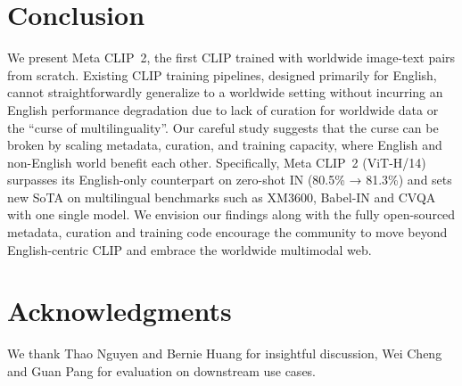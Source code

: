 \section{Conclusion}
\label{conclusion}

We present Meta CLIP~2, the first CLIP trained with worldwide image-text pairs from scratch. Existing CLIP training pipelines, designed primarily for English, cannot straightforwardly generalize to a worldwide setting without incurring an English performance degradation due to lack of curation for worldwide data or the ``curse of multilinguality''. Our careful study suggests that the curse can be broken by scaling metadata, curation, and training capacity, where English and non-English world benefit each other. Specifically, Meta CLIP~2 (ViT-H/14) surpasses its English-only counterpart on zero-shot IN (80.5\% → 81.3\%) and sets new SoTA on multilingual benchmarks such as XM3600, Babel-IN and CVQA with one single model. We envision our findings along with the fully open-sourced metadata, curation and training code encourage the community to move beyond English-centric CLIP and embrace the worldwide multimodal web.

\section*{Acknowledgments}
We thank Thao Nguyen and Bernie Huang for insightful discussion, Wei Cheng and Guan Pang for evaluation on downstream use cases.
